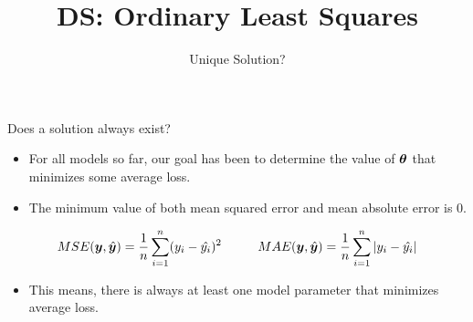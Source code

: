 \documentclass[aspectratio=169]{../latex_main/tntbeamer}  %
\title[Regression]{DS: Ordinary Least Squares}
\subtitle{Unique Solution?}
\begin{document}
	
	\maketitle
	\begin{frame}{Does a solution always exist?}
	    \begin{itemize}
	        \item For all models so far, our goal has been to determine the value of $\bm{\bm{\theta}}$ that minimizes some average loss.
	        \item The minimum value of both mean squared error and mean absolute error is 0.
	    \end{itemize}
	    \begin{equation*}
	        MSE(\bm{y},\hat{\bm{y}}) = \frac{1}{n}\sum\limits_{i=1}^n(y_i - \hat{y_i})^2 \hspace{1cm} MAE(\bm{y},\hat{\bm{y}}) = \frac{1}{n}\sum\limits_{i=1}^n|y_i - \hat{y_i}|
	    \end{equation*}
	    
	    \begin{itemize}
	        \item This means, there is always at least one model parameter that minimizes average loss.
	    \end{itemize}
	\end{frame}
	
	
	
\end{document}

